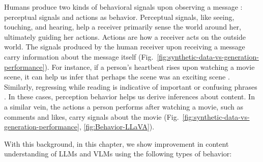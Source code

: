 Humans produce two kinds of behavioral signals upon observing a message \cite{bertenthal1996origins,prinz1997perception}: perceptual signals and actions as behavior. Perceptual signals, like seeing, touching, and hearing, help a receiver primarily sense the world around her, ultimately guiding her actions. Actions are how a receiver acts on the outside world. 
The signals produced by the human receiver upon receiving a message carry information about the message itself (Fig.~\ref{fig:synthetic-data-vs-generation-performance}). For instance, if a person's heartbeat rises upon watching a movie scene, it can help us infer that perhaps the scene was an exciting scene \cite{dzedzickis2020human}. Similarly, regressing while reading is indicative of important or confusing phrases \cite{bicknell2011readers}. In these cases, perception behavior helps us derive inferences about content. In a similar vein, the actions a person performs after watching a movie, such as comments and likes, carry signals about the movie (Fig.~\ref{fig:synthetic-data-vs-generation-performance}, \ref{fig:Behavior-LLaVA}). 


With this background, in this chapter, we show improvement in content understanding of LLMs and VLMs using the following types of behavior:

